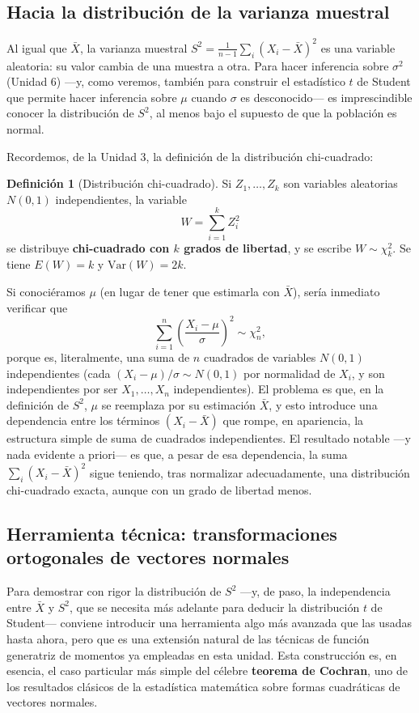 \documentclass[11pt,a4paper]{article}
\theoremstyle{plain}
\theoremstyle{definition}
\newtheorem{definicion}[teorema]{Definición}
\theoremstyle{remark}
\begin{document}
\subsection{Hacia la distribución de la varianza muestral}
\label{sec:distribucion-s2}

Al igual que $\bar X$, la varianza muestral $S^2=\frac{1}{n-1}\sum_i(X_i-\bar X)^2$ es una variable aleatoria: su valor cambia de una muestra a otra. Para hacer inferencia sobre $\sigma^2$ (Unidad 6) —y, como veremos, también para construir el estadístico $t$ de Student que permite hacer inferencia sobre $\mu$ cuando $\sigma$ es desconocido— es imprescindible conocer la distribución de $S^2$, al menos bajo el supuesto de que la población es normal.

Recordemos, de la Unidad 3, la definición de la distribución chi-cuadrado:

\begin{definicion}[Distribución chi-cuadrado]
Si $Z_1,\dots,Z_k$ son variables aleatorias $N(0,1)$ independientes, la variable
$$W = \sum_{i=1}^k Z_i^2$$
se distribuye \textbf{chi-cuadrado con $k$ grados de libertad}, y se escribe $W\sim\chi^2_k$. Se tiene $E(W)=k$ y $\mathrm{Var}(W)=2k$.
\end{definicion}

Si conociéramos $\mu$ (en lugar de tener que estimarla con $\bar X$), sería inmediato verificar que
$$\sum_{i=1}^n \left(\frac{X_i-\mu}{\sigma}\right)^2 \sim \chi^2_n,$$
porque es, literalmente, una suma de $n$ cuadrados de variables $N(0,1)$ independientes (cada $(X_i-\mu)/\sigma\sim N(0,1)$ por normalidad de $X_i$, y son independientes por ser $X_1,\dots,X_n$ independientes). El problema es que, en la definición de $S^2$, $\mu$ se reemplaza por su estimación $\bar X$, y esto introduce una dependencia entre los términos $(X_i-\bar X)$ que rompe, en apariencia, la estructura simple de suma de cuadrados independientes. El resultado notable —y nada evidente a priori— es que, a pesar de esa dependencia, la suma $\sum_i (X_i-\bar X)^2$ sigue teniendo, tras normalizar adecuadamente, una distribución chi-cuadrado exacta, aunque con un grado de libertad menos.

\subsection{Herramienta técnica: transformaciones ortogonales de vectores normales}

Para demostrar con rigor la distribución de $S^2$ —y, de paso, la independencia entre $\bar X$ y $S^2$, que se necesita más adelante para deducir la distribución $t$ de Student— conviene introducir una herramienta algo más avanzada que las usadas hasta ahora, pero que es una extensión natural de las técnicas de función generatriz de momentos ya empleadas en esta unidad. Esta construcción es, en esencia, el caso particular más simple del célebre \textbf{teorema de Cochran}, uno de los resultados clásicos de la estadística matemática sobre formas cuadráticas de vectores normales.
\end{document}
